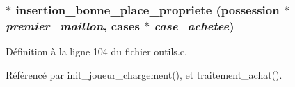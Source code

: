 \subsubsection{$\ast$ insertion\_\-bonne\_\-place\_\-propriete ({\bf possession} $\ast$ {\em premier\_\-maillon}, {\bf cases} $\ast$ {\em case\_\-achetee})}\label{outils_8h_d53767c5dbc0daa1a8de086094690eaa}




D\'{e}finition \`{a} la ligne 104 du fichier outils.c.

R\'{e}f\'{e}renc\'{e} par init\_\-joueur\_\-chargement(), et traitement\_\-achat().

